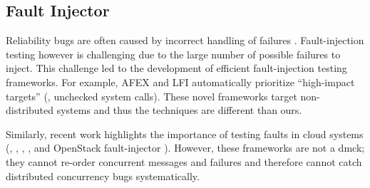 \subsection{Fault Injector}
Reliability bugs are often caused by incorrect handling of
failures \cite{Gunawi+11-FateDestini, Gunawi+08-EIO}.  Fault-injection testing
however is challenging due to the large number of possible failures to inject.
This challenge led to the development of efficient fault-injection testing
frameworks.  For example, AFEX \cite{Banabic+12-Blackbox} and
LFI \cite{Marinescu+10-ExtensibleLFI} automatically prioritize ``high-impact
targets'' (\eg, unchecked system calls).  These novel frameworks target
non-distributed systems and thus the techniques are different than ours.

Similarly, recent work highlights the importance of testing faults in cloud
systems (\eg, \fate \cite{Gunawi+11-FateDestini}, \setsudo
\cite{Joshi+13-SetsudoTesting}, \prefail \cite{Joshi+11-PreFail}, and OpenStack
fault-injector \cite{Ju+13-FaultResOpenStack}). However, these frameworks are
not a dmck; they cannot re-order concurrent messages and failures and therefore
cannot catch distributed concurrency bugs systematically.

